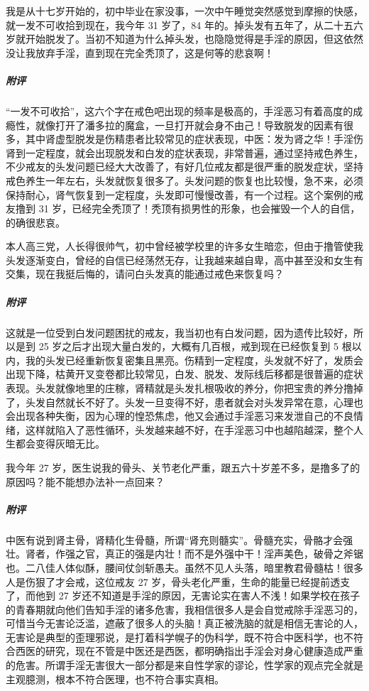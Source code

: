 \begin{case}
    我是从十七岁开始的，初中毕业在家没事，一次中午睡觉突然感觉到摩擦的快感，就一发不可收拾到现在，我今年 31 岁了，84 年的。掉头发有五年了，从二十五六岁就开始脱发了。当初不知道为什么掉头发，也隐隐觉得是手淫的原因，但这依然没让我放弃手淫，直到现在完全秃顶了，这是何等的悲哀啊！
    \subparagraph{附评} “一发不可收拾”，这六个字在戒色吧出现的频率是极高的，手淫恶习有着高度的成瘾性，就像打开了潘多拉的魔盒，一旦打开就会身不由己！导致脱发的因素有很多，其中肾虚型脱发是伤精患者比较常见的症状表现，中医：发为肾之华！手淫伤肾到一定程度，就会出现脱发和白发的症状表现，非常普遍，通过坚持戒色养生，不少戒友的头发问题已经大大改善了，有好几位戒友都是很严重的脱发症状，坚持戒色养生一年左右，头发就恢复很多了。头发问题的恢复也比较慢，急不来，必须保持耐心，肾气恢复到一定程度，头发即可慢慢改善，有一个过程。这个案例的戒友撸到 31 岁，已经完全秃顶了！秃顶有损男性的形象，也会摧毁一个人的自信，的确很悲哀。
\end{case}

\begin{case}
    本人高三党，人长得很帅气，初中曾经被学校里的许多女生暗恋，但由于撸管使我头发逐渐变白，曾经的自信已经荡然无存，让我越来越自卑，高中甚至没和女生有交集，现在我挺后悔的，请问白头发真的能通过戒色来恢复吗？
    \subparagraph{附评} 这就是一位受到白发问题困扰的戒友，我当初也有白发问题，因为遗传比较好，所以是到 25 岁之后才出现大量白发的，大概有几百根，戒到现在已经恢复到 5 根以内，我的头发已经重新恢复密集且黑亮。伤精到一定程度，头发就不好了，发质会出现下降，枯黄开叉变卷都比较常见，白发、脱发、发际线后移都是很普遍的症状表现。头发就像地里的庄稼，肾精就是头发扎根吸收的养分，你把宝贵的养分撸掉了，头发自然就长不好了。头发一旦变得不好，患者就会对头发异常在意，心理也会出现各种失衡，因为心理的惶恐焦虑，他又会通过手淫恶习来发泄自己的不良情绪，这样就陷入了恶性循环，头发越来越不好，在手淫恶习中也越陷越深，整个人生都会变得灰暗无比。
\end{case}

\begin{case}
    我今年 27 岁，医生说我的骨头、关节老化严重，跟五六十岁差不多，是撸多了的原因吗？能不能想办法补一点回来？
    \subparagraph{附评} 中医有说到肾主骨，肾精化生骨髓，所谓“肾充则髓实”。骨髓充实，骨骼才会强壮。肾者，作强之官，真正的强是内壮！而不是外强中干！淫声美色，破骨之斧锯也。二八佳人体似酥，腰间仗剑斩愚夫。虽然不见人头落，暗里教君骨髓枯！很多人是伤狠了才会戒，这位戒友 27 岁，骨头老化严重，生命的能量已经提前透支了，而他到 27 岁还不知道是手淫的原因，无害论实在害人不浅！如果学校在孩子的青春期就向他们告知手淫的诸多危害，我相信很多人是会自觉戒除手淫恶习的，可惜当今无害论泛滥，遮蔽了很多人的头脑！真正被洗脑的就是相信无害论的人，无害论是典型的歪理邪说，是打着科学幌子的伪科学，既不符合中医科学，也不符合西医的研究，现在不管是中医还是西医，都明确指出手淫会对身心健康造成严重的危害。所谓手淫无害很大一部分都是来自性学家的谬论，性学家的观点完全就是主观臆测，根本不符合医理，也不符合事实真相。
\end{case}

